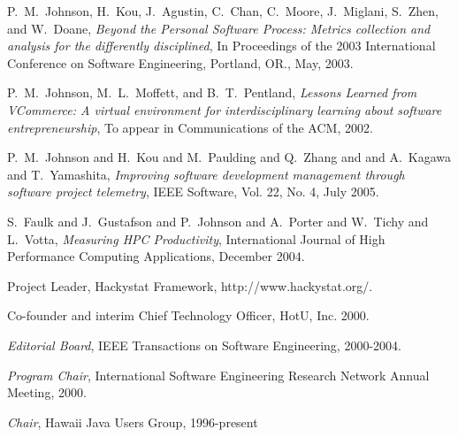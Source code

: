 \begin{Publications: Other Significant}

\item P.~M.~Johnson, H.~Kou, J.~Agustin, C.~Chan, C.~Moore, 
J.~Miglani, S.~Zhen, and W.~Doane, {\em Beyond
the Personal Software Process: Metrics collection and analysis for the
differently disciplined}, In Proceedings of the 2003 International
Conference on Software Engineering, Portland, OR., May, 2003.

\item P.~M.~Johnson, M.~L.~Moffett, and B.~T.~Pentland, {\em Lessons
Learned from VCommerce: A virtual environment for interdisciplinary
learning about software entrepreneurship}, To appear in Communications of
the ACM, 2002.

\item P.~M.~Johnson and H.~Kou and M.~Paulding and Q.~Zhang and
and A.~Kagawa and T.~Yamashita, {\em Improving software development
management through software project telemetry}, 
IEEE Software, Vol. 22, No. 4, July 2005.

\item S.~Faulk and J.~Gustafson and P.~Johnson and A.~Porter and W.~Tichy 
and L.~Votta, {\em Measuring {HPC} Productivity}, 
International Journal of High Performance Computing Applications, December 2004. 



\end{Publications: Other Significant}


\begin{Synergistic Activities}

\item {Project Leader}, Hackystat Framework, http://www.hackystat.org/.

\item {Co-founder and interim Chief Technology Officer}, HotU, Inc.  2000.

\item {\em Editorial Board}, IEEE Transactions on Software Engineering,
2000-2004.

\item {\em Program Chair}, International Software Engineering Research Network
 Annual Meeting, 2000.

\item {\em Chair}, Hawaii Java Users Group, 1996-present

\end{Synergistic Activities}



